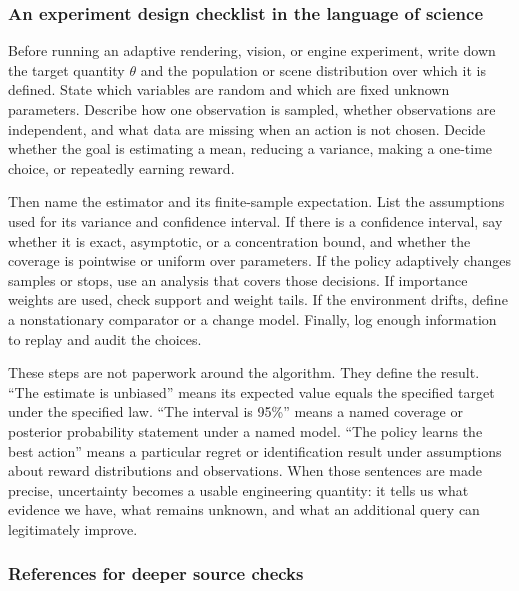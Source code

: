 \subsubsection{An experiment design checklist in the language of science}\label{02-foundations-ii-ch029-an-experiment-design-checklist-in-the-language-of-science}

\hypertarget{02-foundations-ii-ch029-an-experiment-design-checklist-in-the-language-of-science}{}

Before running an adaptive rendering, vision, or engine experiment, write down the target quantity \(\theta\) and the population or scene distribution over which it is defined. State which variables are random and which are fixed unknown parameters. Describe how one observation is sampled, whether observations are independent, and what data are missing when an action is not chosen. Decide whether the goal is estimating a mean, reducing a variance, making a one-time choice, or repeatedly earning reward.

Then name the estimator and its finite-sample expectation. List the assumptions used for its variance and confidence interval. If there is a confidence interval, say whether it is exact, asymptotic, or a concentration bound, and whether the coverage is pointwise or uniform over parameters. If the policy adaptively changes samples or stops, use an analysis that covers those decisions. If importance weights are used, check support and weight tails. If the environment drifts, define a nonstationary comparator or a change model. Finally, log enough information to replay and audit the choices.

These steps are not paperwork around the algorithm. They define the result. ``The estimate is unbiased'' means its expected value equals the specified target under the specified law. ``The interval is 95\%'' means a named coverage or posterior probability statement under a named model. ``The policy learns the best action'' means a particular regret or identification result under assumptions about reward distributions and observations. When those sentences are made precise, uncertainty becomes a usable engineering quantity: it tells us what evidence we have, what remains unknown, and what an additional query can legitimately improve.

\subsubsection{References for deeper source checks}\label{02-foundations-ii-ch029-references-for-deeper-source-checks}

